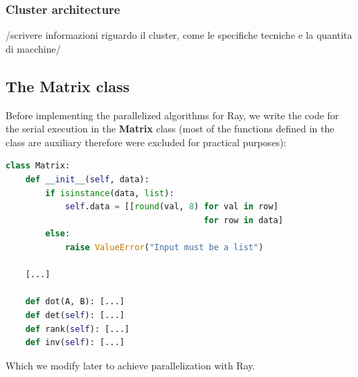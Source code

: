 \subsubsection{Cluster architecture}
/scrivere informazioni riguardo il cluster, come le specifiche tecniche e la quantita di macchine/

\pagebreak
\subsection{The Matrix class}
Before implementing the parallelized algorithms for Ray, we write the code for the serial execution in the \textbf{Matrix} class (most of the functions defined in the class are auxiliary therefore were excluded for practical purposes):

\begin{lstlisting}[language=Python, label=Matrix class]
class Matrix:
    def __init__(self, data):
        if isinstance(data, list):
            self.data = [[round(val, 8) for val in row]
                                        for row in data]
        else:
            raise ValueError("Input must be a list")
    
    [...]

    def dot(A, B): [...]
    def det(self): [...]
    def rank(self): [...]
    def inv(self): [...]
\end{lstlisting}
Which we modify later to achieve parallelization with Ray.

\pagebreak
